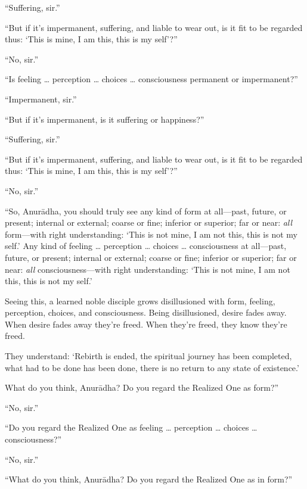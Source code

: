 \documentclass[12pt,openany]{book}%
\begin{document}
“Suffering, sir.” 

“But if it’s impermanent, suffering, and liable to wear out, is it fit to be regarded thus: ‘This is mine, I am this, this is my self’?” 

“No, sir.” 

“Is feeling … perception … choices … consciousness permanent or impermanent?” 

“Impermanent, sir.” 

“But if it’s impermanent, is it suffering or happiness?” 

“Suffering, sir.” 

“But if it’s impermanent, suffering, and liable to wear out, is it fit to be regarded thus: ‘This is mine, I am this, this is my self’?” 

“No, sir.” 

“So, \textsanskrit{Anurādha}, you should truly see any kind of form at all—past, future, or present; internal or external; coarse or fine; inferior or superior; far or near: \emph{all} form—with right understanding: ‘This is not mine, I am not this, this is not my self.’ Any kind of feeling … perception … choices … consciousness at all—past, future, or present; internal or external; coarse or fine; inferior or superior; far or near: \emph{all} consciousness—with right understanding: ‘This is not mine, I am not this, this is not my self.’ 

Seeing this, a learned noble disciple grows disillusioned with form, feeling, perception, choices, and consciousness. Being disillusioned, desire fades away. When desire fades away they’re freed. When they’re freed, they know they’re freed. 

They understand: ‘Rebirth is ended, the spiritual journey has been completed, what had to be done has been done, there is no return to any state of existence.’ 

What do you think, \textsanskrit{Anurādha}? Do you regard the Realized One as form?” 

“No, sir.” 

“Do you regard the Realized One as feeling … perception … choices … consciousness?” 

“No, sir.” 

“What do you think, \textsanskrit{Anurādha}? Do you regard the Realized One as in form?” 
\end{document}
